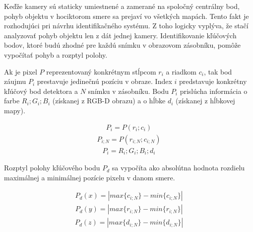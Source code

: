 Keďže kamery sú staticky umiestnené a zamerané na spoločný centrálny bod, pohyb objektu v hociktorom smere sa prejaví vo všetkých mapách. Tento fakt je rozhodujúci pri návrhu identifikačného systému. Z toho logicky vyplýva, že stačí analyzovať pohyb objektu len z dát jednej kamery. Identifikovanie kľúčových bodov, ktoré budú zhodné pre každú snímku v obrazovom zásobníku, pomôže vypočítať pohyb a rozptyl polohy. \newline

Ak je pixel $P$ reprezentovaný konkrétnym stĺpcom $r_{i}$ a riadkom $c_{i}$, tak bod záujmu $P_{i}$ prestavuje jedinečnú pozíciu v obraze. Index $i$ predstavuje konkrétny kľúčový bod detektora a $N$ snímku v zásobníku. Bodu $P_{i}$ prislúcha informácia o farbe $R_{i};G_{i};B_{i}$ (získanej z RGB-D obrazu) a o hĺbke $d_{i}$ (získanej z hĺbkovej mapy).

\begin{equation}
\label{eq:pixels:a}
\begin{aligned}
P_{i}=P\left(r_{i};c_{i}\right)
\end{aligned}
\end{equation}
\begin{equation}
\label{eq:pixels:b}
\begin{aligned}
P_{i;N}=P\left(r_{i;N};c_{i;N}\right)
\end{aligned}
\end{equation}
\begin{equation}
\label{eq:pixels:c}
\begin{aligned}
P_{i}=R_{i};G_{i};B_{i};d_{i}
\end{aligned}
\end{equation}

\noindent Rozptyl polohy kľúčového bodu $P_d$ sa vypočíta ako absolútna hodnota rozdielu maximálnej a minimálnej pozície pixelu v danom smere. 

\begin{equation}
\label{eq:pixels:d}
\begin{aligned}
P_d\left(x\right)=\left|  max\lbrace c_{i;N} \rbrace -min\lbrace c_{i;N} \rbrace \right| 
\end{aligned}
\end{equation}
\begin{equation}
\label{eq:pixels:e}
\begin{aligned}
P_d\left(y\right)=\left|  max\lbrace r_{i;N} \rbrace -min\lbrace r_{i;N} \rbrace \right| 
\end{aligned}
\end{equation}
\begin{equation}
\label{eq:pixels:f}
\begin{aligned}
P_d\left(z\right)=\left|  max\lbrace d_{i;N} \rbrace -min\lbrace d_{i;N} \rbrace \right| 
\end{aligned}
\end{equation}

